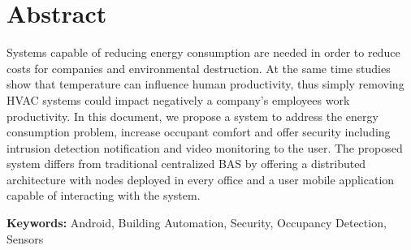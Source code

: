 \chapter*{Abstract}


Systems capable of reducing energy consumption are needed in order to reduce costs for companies and environmental destruction. At the same time studies show that temperature can influence human productivity, thus simply removing HVAC systems could impact negatively a company's employees work productivity.
In this document, we propose a system to address the energy consumption problem, increase occupant comfort and offer security including intrusion detection notification and video monitoring to the user. The proposed system differs from traditional centralized \ac{BAS} by offering a distributed architecture with nodes deployed in every office and a user mobile application capable of interacting with the system.
\vspace{1cm}

\textbf{\Large Keywords:} Android, Building Automation, Security, Occupancy Detection, Sensors

\cleardoublepage
